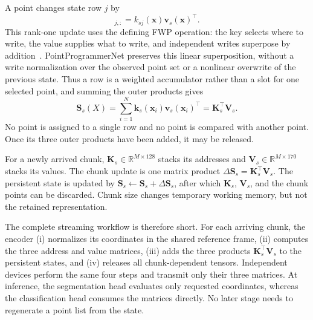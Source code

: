 \documentclass[times,twocolumn,final,authoryear]{elsarticle}
\newcommand{\R}{\mathbb{R}}
\newcommand{\Sstate}{\mathbf{S}}
\begin{document}
A point changes state row $j$ by
\begin{equation}
[\Delta\Sstate_s(\bm x)]_{j,:}=k_{sj}(\bm x)\bm v_s(\bm x)^\top .
\label{eq:single-write-main}
\end{equation}
This rank-one update uses the defining FWP operation: the key selects where to write, the value supplies what to write, and independent writes superpose by addition~\cite{schlag2021linear}. PointProgrammerNet preserves this linear superposition, without a write normalization over the observed point set or a nonlinear overwrite of the previous state. Thus a row is a weighted accumulator rather than a slot for one selected point, and summing the outer products gives
\begin{equation}
\Sstate_s(X)=\sum_{i=1}^{N}\bm k_s(\bm x_i)\bm v_s(\bm x_i)^\top
=\bm K_s^\top\bm V_s.
\label{eq:state-main}
\end{equation}
No point is assigned to a single row and no point is compared with another point. Once its three outer products have been added, it may be released.

For a newly arrived chunk, $\bm K_s\in\R^{M\times128}$ stacks its addresses and $\bm V_s\in\R^{M\times170}$ stacks its values. The chunk update is one matrix product $\Delta\Sstate_s=\bm K_s^\top\bm V_s$. The persistent state is updated by $\Sstate_s\leftarrow\Sstate_s+\Delta\Sstate_s$, after which $\bm K_s$, $\bm V_s$, and the chunk points can be discarded. Chunk size changes temporary working memory, but not the retained representation.

The complete streaming workflow is therefore short. For each arriving chunk, the encoder (i) normalizes its coordinates in the shared reference frame, (ii) computes the three address and value matrices, (iii) adds the three products $\bm K_s^\top\bm V_s$ to the persistent states, and (iv) releases all chunk-dependent tensors. Independent devices perform the same four steps and transmit only their three matrices. At inference, the segmentation head evaluates only requested coordinates, whereas the classification head consumes the matrices directly. No later stage needs to regenerate a point list from the state.
\end{document}
